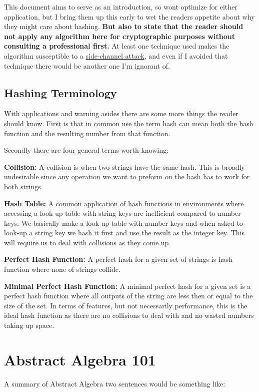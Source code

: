 This document aims to serve as an introduction,
so wont optimize for either application,
but I bring them up this early to wet the readers appetite about why they might care about hashing.
{\textbf{ But also to state that the reader should not apply any algorithm here for cryptographic purposes without consulting a professional first.}}
At least one technique used makes the algorithm susceptible to a \hyperref[appx:side-channel]{side-channel attack},
and even if I avoided that technique there would be another one I'm ignorant of.

\subsection{Hashing Terminology}
With applications and warning asides there are some more things the reader should know.
First is that in common use the term hash can mean both the hash function and the resulting number from that function.

Secondly there are four general terms worth knowing:

{\textbf{Collision:}} 
A collision is when two strings have the same hash.
This is broadly undesirable since any operation we want to preform on the hash has to work for both strings.

{\textbf{Hash Table:}}
A common application of hash functions in environments where accessing a look-up table with string keys are inefficient compared to number keys.
We basically make a look-up table with number keys and when asked to look-up a string key we hash it first and use the result as the integer key.
This will require us to deal with collisions as they come up.

{\textbf{Perfect Hash Function:}}
A perfect hash for a given set of strings is hash function where none of strings collide.

{\textbf{Minimal Perfect Hash Function:}}
A minimal perfect hash for a given set is a perfect hash function where all outputs of the string are less then or equal to the size of the set.
In terms of features,
but not necessarily performance,
this is the ideal hash function as there are no collisions to deal with and no wasted numbers taking up space.

\section{Abstract Algebra 101}
A summary of Abstract Algebra two sentences would be something like:

